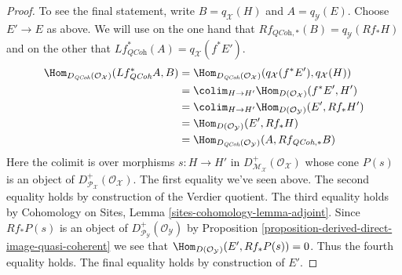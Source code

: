 \begin{proof}
\medskip\noindent
To see the final statement, write $B = q_\mathcal{X}(H)$ and
$A = q_\mathcal{Y}(E)$.
Choose $E' \to E$ as above.
We will use on the one hand that
$Rf_{\textit{QCoh}, *}(B) = q_\mathcal{Y}(Rf_*H)$
and on the other that
$Lf^*_{\textit{QCoh}}(A) = q_\mathcal{X}(f^*E')$.
\begin{align*}
\Hom_{D_{\textit{QCoh}}(\mathcal{O}_\mathcal{X})}(Lf^*_{\textit{QCoh}}A, B)
& = 
\Hom_{D_{\textit{QCoh}}(\mathcal{O}_\mathcal{X})}(q_\mathcal{X}(f^*E'),
q_\mathcal{X}(H)) \\
& = 
\colim_{H \to H'} \Hom_{D(\mathcal{O}_\mathcal{X})}(f^*E', H') \\
& = \colim_{H \to H'} \Hom_{D(\mathcal{O}_\mathcal{Y})}(E', Rf_*H') \\
& = \Hom_{D(\mathcal{O}_\mathcal{Y})}(E', Rf_*H) \\
& =
\Hom_{D_{\textit{QCoh}}(\mathcal{O}_\mathcal{Y})}(A, Rf_{\textit{QCoh}, *}B)
\end{align*}
Here the colimit is over morphisms $s : H \to H'$ in
$D^+_{\mathcal{M}_\mathcal{X}}(\mathcal{O}_\mathcal{X})$
whose cone $P(s)$ is an object of
$D^+_{\mathcal{P}_\mathcal{X}}(\mathcal{O}_\mathcal{X})$.
The first equality we've seen above.
The second equality holds by construction of the Verdier quotient.
The third equality holds by
Cohomology on Sites, Lemma \ref{sites-cohomology-lemma-adjoint}.
Since $Rf_*P(s)$ is an object of
$D^+_{\mathcal{P}_\mathcal{Y}}(\mathcal{O}_\mathcal{Y})$ by
Proposition \ref{proposition-derived-direct-image-quasi-coherent}
we see that $\Hom_{D(\mathcal{O}_\mathcal{Y})}(E', Rf_*P(s)) = 0$.
Thus the fourth equality holds. The final equality
holds by construction of $E'$.
\end{proof}














